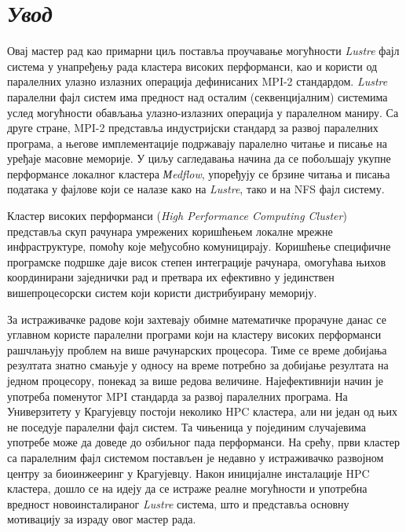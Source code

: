 \chapter{ \textit{Увод} }

Овај мастер рад као примарни циљ поставља проучавање могућности \textit{Lustre} фајл система у унапређењу рада кластера високих перформанси, као и користи од паралелних улазно излазних операција дефинисаних MPI-2 стандардом.
\textit{Lustre} паралелни фајл систем има предност над осталим (секвенцијалним) системима услед могућности обављања улазно-излазних операција у паралелном маниру. Са друге стране, MPI-2 представља индустријски стандард за развој паралелних програма, а његове имплементације подржавају паралелно читање и писање на уређаје масовне меморије. У циљу сагледавања начина да се побољшају укупне перформансе локалног кластера \textit{Мedflow}, упоређују се брзине читања и писања података у фајлове који се налазе како на \textit{Lustre}, тако и на NFS  фајл систему.

Кластер високих перформанси (\textit{High Performance Computing Cluster}) представља скуп рачунара умрежених коришћењем локалне мрежне инфраструктуре, помоћу које међусобно комуницирају. Коришћење специфичне програмске подршке даје висок степен интеграције рачунара, омогућава њихов координирани заједнички рад и претвара их ефективно у јединствен вишепроцесорски систем који користи дистрибуирану меморију.

За истраживачке радове који захтевају обимне математичке прорачуне данас се углавном користе паралелни програми који на кластеру високих перформанси рашчлањују проблем на више рачунарских процесора. Тиме се време добијања резултата знатно смањује у односу на време потребно за добијање резултата на једном процесору, понекад за више редова величине. Најефективнији начин је употреба поменутог MPI стандарда за развој паралелних програма. На Универзитету у Крагујевцу постоји неколико HPC кластера, али ни један од њих не поседује паралелни фајл систем. Та чињеница у појединим случајевима употребе може да доведе до озбиљног пада перформанси. На срећу, први кластер са паралелним фајл системом постављен је недавно у истраживачко развојном центру за биоинжееринг у Крагујевцу. Након иницијалне инсталације HPC кластера, дошло се на идеју да се истраже реалне могућности и употребна вредност новоинсталираног \textit{Lustre} система, што и представља основну мотивацију за израду овог мастер рада.
 
